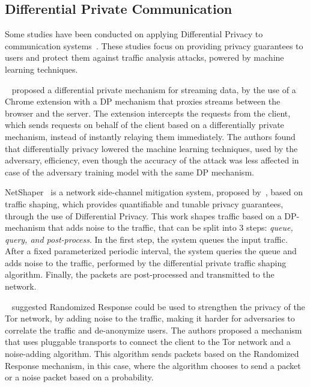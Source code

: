 \subsection{Differential Private Communication}\label{subsec:diff_priv_comm}

Some studies have been conducted on applying Differential Privacy to communication systems~\cite{VilalongaINForum, StatPrivStreaming, NetShaper}. These studies focus on providing privacy guarantees to users and protect them against traffic analysis attacks, powered by machine learning techniques.

\citeauthor{StatPrivStreaming}~\cite{StatPrivStreaming} proposed a differential private mechanism for streaming data, by the use of a Chrome extension with a DP mechanism that proxies streams between the browser and the server. The extension intercepts the requests from the client, which sends requests on behalf of the client based on a differentially private mechanism, instead of instantly relaying them immediately. The authors found that differentially privacy lowered the machine learning techniques, used by the adversary, efficiency, even though the accuracy of the attack was less affected in case of the adversary training model with the same DP mechanism.

NetShaper~\cite{NetShaper} is a network side-channel mitigation system, proposed by~\citeauthor{NetShaper}, based on traffic shaping, which provides quantifiable and tunable privacy guarantees, through the use of Differential Privacy. This work shapes traffic based on a DP-mechanism that adds noise to the traffic, that can be split into 3 steps: \textit{queue, query, and post-process}. In the first step, the system queues the input traffic. After a fixed parameterized periodic interval, the system queries the queue and adds noise to the traffic, performed by the differential private traffic shaping algorithm. Finally, the packets are post-processed and transmitted to the network. 

\citeauthor{VilalongaINForum}~\cite{VilalongaINForum} suggested Randomized Response could be used to strengthen the privacy of the Tor network, by adding noise to the traffic, making it harder for adversaries to correlate the traffic and de-anonymize users. The authors proposed a mechanism that uses pluggable transports to connect the client to the Tor network and a noise-adding algorithm. This algorithm sends packets based on the Randomized Response mechanism, in this case, where the algorithm chooses to send a packet or a noise packet based on a probability.

